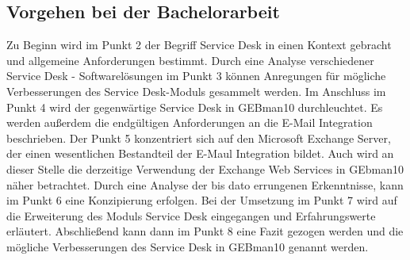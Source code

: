 \subsection{Vorgehen bei der Bachelorarbeit}
\noindent
Zu Beginn wird im Punkt 2 der Begriff Service Desk in einen Kontext gebracht und allgemeine Anforderungen bestimmt. Durch eine Analyse verschiedener Service Desk - Softwarelösungen im Punkt 3 können Anregungen für mögliche Verbesserungen des Service Desk-Moduls gesammelt werden. Im Anschluss im Punkt 4 wird der gegenwärtige Service Desk in GEBman10 durchleuchtet. Es werden außerdem die endgültigen Anforderungen an die E-Mail Integration beschrieben. Der Punkt 5 konzentriert sich auf den Microsoft Exchange Server, der einen wesentlichen Bestandteil der E-Maul Integration bildet. Auch wird an dieser Stelle die derzeitige Verwendung der Exchange Web Services in GEbman10 näher betrachtet.  Durch eine Analyse der bis dato errungenen Erkenntnisse, kann im Punkt 6 eine Konzipierung erfolgen. Bei der Umsetzung im Punkt 7 wird auf die Erweiterung des Moduls Service Desk eingegangen und Erfahrungswerte erläutert. Abschließend kann dann im Punkt 8 eine Fazit gezogen werden und die mögliche Verbesserungen des Service Desk in GEBman10 genannt werden.